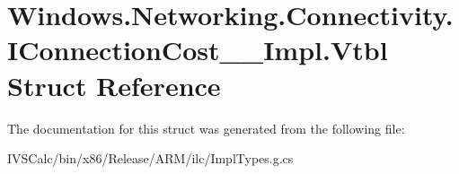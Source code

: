 \hypertarget{struct_windows_1_1_networking_1_1_connectivity_1_1_i_connection_cost_____impl_1_1_vtbl}{}\section{Windows.\+Networking.\+Connectivity.\+I\+Connection\+Cost\+\_\+\+\_\+\+Impl.\+Vtbl Struct Reference}
\label{struct_windows_1_1_networking_1_1_connectivity_1_1_i_connection_cost_____impl_1_1_vtbl}


The documentation for this struct was generated from the following file\+:\begin{DoxyCompactItemize}
\item 
I\+V\+S\+Calc/bin/x86/\+Release/\+A\+R\+M/ilc/Impl\+Types.\+g.\+cs\end{DoxyCompactItemize}
